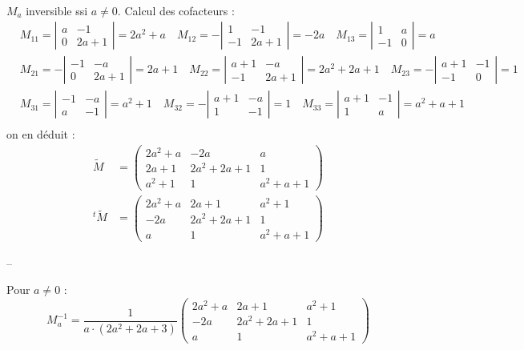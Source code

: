{{$$\begin{aligned}
	&
\end{aligned}
$$
$M_a$ inversible ssi $a \neq 0$.
Calcul des cofacteurs :
$$
\begin{aligned}
	& M_{11}=\left|\begin{array}{cc}
		a & -1 \\
		0 & 2 a+1
	\end{array}\right|=2 a^2+a \quad M_{12}=-\left|\begin{array}{cc}
		1 & -1 \\
		-1 & 2 a+1
	\end{array}\right|=-2 a \quad M_{13}=\left|\begin{array}{cc}
		1 & a \\
		-1 & 0
	\end{array}\right|=a \\
	& M_{21}=-\left|\begin{array}{cc}
		-1 & -a \\
		0 & 2 a+1
	\end{array}\right|=2 a+1 \quad M_{22}=\left|\begin{array}{cc}
		a+1 & -a \\
		-1 & 2 a+1
	\end{array}\right|=2 a^2+2 a+1 \quad M_{23}=-\left|\begin{array}{cc}
		a+1 & -1 \\
		-1 & 0
	\end{array}\right|=1 \\
	& M_{31}=\left|\begin{array}{cc}
		-1 & -a \\
		a & -1
	\end{array}\right|=a^2+1 \quad M_{32}=-\left|\begin{array}{cc}
		a+1 & -a \\
		1 & -1
	\end{array}\right|=1 \quad M_{33}=\left|\begin{array}{cc}
		a+1 & -1 \\
		1 & a
	\end{array}\right|=a^2+a+1 \\
	&
\end{aligned}
$$
on en déduit :
$$
\begin{aligned}
	\tilde{M} & =\left(\begin{array}{ccc}
		2 a^2+a & -2 a & a \\
		2 a+1 & 2 a^2+2 a+1 & 1 \\
		a^2+1 & 1 & a^2+a+1
	\end{array}\right) \\
	{ }^t \tilde{M} & =\left(\begin{array}{ccc}
		2 a^2+a & 2 a+1 & a^2+1 \\
		-2 a & 2 a^2+2 a+1 & 1 \\
		a & 1 & a^2+a+1
	\end{array}\right)
\end{aligned}
$$

--

Pour $a \neq 0$ :
$$
M_a^{-1}=\frac{1}{a \cdot\left(2 a^2+2 a+3\right)}\left(\begin{array}{ccc}
	2 a^2+a & 2 a+1 & a^2+1 \\
	-2 a & 2 a^2+2 a+1 & 1 \\
	a & 1 & a^2+a+1
\end{array}\right)
$$ }}
